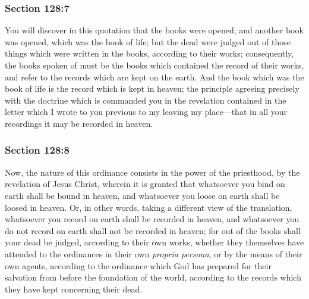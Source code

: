 	\subsubsection{Section 128:7} %
		\label{DC128-7}

		You will discover in this quotation that the books were opened; and another book was opened, which was the book of life; but the dead were judged out of those things which were written in the books, according to their works; consequently, the books spoken of must be the books which contained the record of their works, and refer to the records which are kept on the earth. And the book which was the book of life is the record which is kept in heaven; the principle agreeing precisely with the doctrine which is commanded you in the revelation contained in the letter which I wrote to you previous to my leaving my place---that in all your recordings it may be recorded in heaven.


	\subsubsection{Section 128:8} %
		\label{DC128-8}

		Now, the nature of this ordinance consists in the power of the priesthood, by the revelation of Jesus Christ, wherein it is granted that whatsoever you bind on earth shall be bound in heaven, and whatsoever you loose on earth shall be loosed in heaven. Or, in other words, taking a different view of the translation, whatsoever you record on earth shall be recorded in heaven, and whatsoever you do not record on earth shall not be recorded in heaven; for out of the books shall your dead be judged, according to their own works, whether they themselves have attended to the ordinances in their own \textit{propria persona}, or by the means of their own agents, according to the ordinance which God has prepared for their salvation from before the foundation of the world, according to the records which they have kept concerning their dead.

